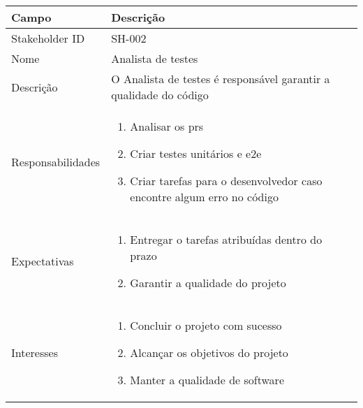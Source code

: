 \vspace{1cm}

\noindent
\begin{tabularx}{\textwidth}{| l | X |}
\hline
Campo             & Descrição                                                                                                                                                                           \\ \hline
Stakeholder ID    & SH-002                                                                                                                                                                              \\ \hline
Nome              & Analista de testes                                                                                                                                                                       \\ \hline
Descrição         & O Analista de testes é responsável garantir a qualidade do código
\\ \hline
Responsabilidades & 
\begin{enumerate}
    \item Analisar os \gls{prs}
    \item Criar testes unitários e \acrshort{e2e}
    \item Criar tarefas para o desenvolvedor caso encontre algum erro no código
\end{enumerate}
\\ \hline

Expectativas      &
\begin{enumerate}
    \item Entregar o tarefas atribuídas dentro do prazo
    \item Garantir a qualidade do projeto
\end{enumerate}
\\ \hline

Interesses        &
\begin{enumerate}
    \item Concluir o projeto com sucesso
    \item Alcançar os objetivos do projeto
    \item Manter a qualidade de software
\end{enumerate}
\\ \hline

\end{tabularx}

\vspace{1cm}
